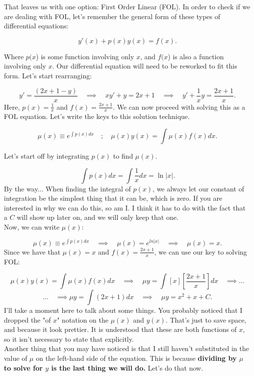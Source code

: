 \documentclass[a4paper,12pt]{article} %
\begin{document}
That leaves us with one option: First Order Linear (FOL). In order to check if we are dealing with FOL, let's remember the general form of these types of differential equations:

$$ y'(x) + p(x)y(x) = f(x). $$

Where $p(x$) is some function involving only $x$, and $f(x$) is also a function involving only $x$. Our differential equation will need to be reworked to fit this form. Let's start rearranging:

$$ y' = \frac{(2x+1 - y)}{x} \quad\implies\quad xy' + y = 2x+1 \quad\implies\quad y' + \frac{1}{x}y = \frac{2x + 1}{x}.   $$
Here, $p(x) = \frac{1}{x}$ and $f(x) = \frac{2x + 1}{x}$. We can now proceed with solving this as a FOL equation. Let's write the keys to this solution technique.

$$ \mu(x) \equiv e^{\int p(x) dx} \quad;\quad \mu(x)y(x) = \int \mu(x)f(x)dx .$$

Let's start off by integrating $p(x)$ to find $\mu(x)$.

$$ \int p(x) dx = \int\frac{1}{x}dx = \ln{|x|}. $$
By the way... When finding the integral of $p(x)$, we always let our constant of integration be the simplest thing that it can be, which is zero. If you are interested in why we can do this, so am I. I think it has to do with the fact that a $C$ will show up later on, and we will only keep that one.\\

Now, we can write $\mu(x)$:

$$ \mu(x) \equiv e^{\int p(x) dx} \quad\implies\quad \mu(x) = e^{ln{|x|}} \quad\implies\quad \mu(x) = x. $$
Since we have that $\mu(x) = x$ and $f(x) = \frac{2x + 1}{x}$, we can use our key to solving FOL:

$$ \mu(x)y(x) = \int \mu(x) f(x) dx \quad\implies\quad \mu y = \int \left[x\right]\left[\frac{2x + 1}{x}\right]dx \quad\implies\ldots $$
$$ \ldots\quad\implies \mu y = \int (2x + 1)dx \quad\implies\quad \mu y = x^2 + x + C.$$
I'll take a moment here to talk about some things. You probably noticed that I dropped the "of $x$" notation on the $\mu(x)$ and $y(x)$. That's just to save space, and because it look prettier. It is understood that these are both functions of $x$, so it isn't necessary to state that explicitly.\\

Another thing that you may have noticed is that I still haven't substituted in the value of $\mu$ on the left-hand side of the equation. This is because \textbf{dividing by $\mu$ to solve for $y$ is the last thing we will do.} Let's do that now.
\end{document}
